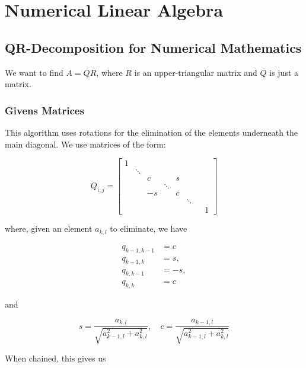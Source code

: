 \chapter{Numerical Linear Algebra}

\section{QR-Decomposition for Numerical Mathematics}

We want to find \(A = QR\), where \(R\) is an upper-triangular matrix and \(Q\) is just a matrix. 

\subsection{Givens Matrices}

This algorithm uses rotations for the elimination of the elements underneath the main diagonal. We use 
matrices of the form:

\[
        Q_{i,j} = 
        \begin{bmatrix}
            1 &        &         &        &         & & &\\
              & \ddots &         &        &         & & &\\
              &        & c       &        &   s    & & &\\
              &        &         & \ddots &         & & &\\
              &        & -s      &        &   c     & & &\\
              &        &         &        &         & \ddots & &\\
              &        &         &        &         &  & & 1
        \end{bmatrix} 
\]

where, given an element \(a_{k,l}\) to eliminate, we have 

\begin{align*}
    q_{k - 1, k - 1} &= c \\ 
    q_{k - 1, k} &= s, \\
    q_{k, k - 1} &= -s,\\ 
    q_{k, k} &= c
\end{align*}

and 

\[
    s = \frac{a_{k, l}}{\sqrt{a_{k - 1, l}^2 + a_{k,l}^2}}, \quad c = \frac{a_{k - 1, l}}{\sqrt{a_{k - 1,l}^2 + a_{k,l}^2}}
\]

When chained, this gives us 

